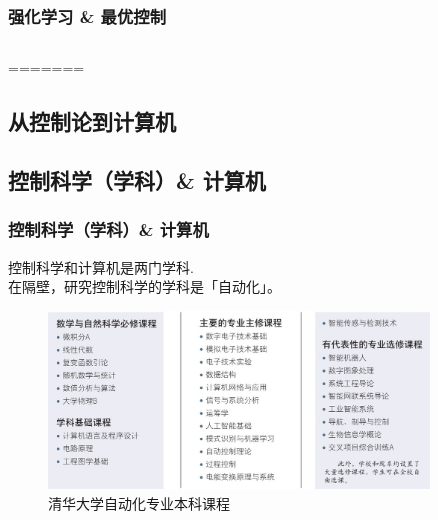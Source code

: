 \documentclass[12pt,AutoFakeBold,aspectratio=43,mathserif]{beamer}
\begin{document}
    \begin{frame}
        \frametitle{强化学习 \& 最优控制}
        \begin{columns}
            \begin{column}{.4\linewidth}
=======

    \section{从控制论到计算机}
    \subsection{控制科学（学科）\& 计算机}
    \begin{frame}
        \frametitle{控制科学（学科）\& 计算机}
        \pause
        控制科学和计算机是两门学科. \\
        在隔壁，研究控制科学的学科是「自动化」。
        \begin{figure}[htbp]
            \caption{清华大学自动化专业本科课程}
            \setlength{\abovecaptionskip}{0.cm}
            \setlength{\belowcaptionskip}{-0.cm}
            \centering
            \vspace{-0.3cm}
            \setlength{\abovecaptionskip}{0.cm}
            \setlength{\belowcaptionskip}{-0.cm}
            \includegraphics[width=0.9\textwidth]{figures/3-1.jpg}
        \end{figure}
    \end{frame}

\end{column}
\end{columns}
\end{frame}
\end{document}
